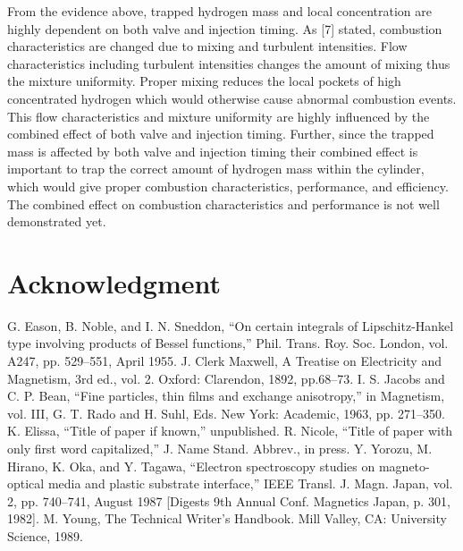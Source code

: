\documentclass[conference]{IEEEtran}
\begin{document}
From the evidence above, trapped hydrogen mass and local concentration are highly dependent on both valve and injection timing.  
As [7] stated, combustion characteristics are changed due to mixing and turbulent intensities.
Flow characteristics including turbulent intensities changes the amount of mixing thus the mixture uniformity. Proper mixing reduces the local pockets of high concentrated hydrogen which would otherwise cause abnormal combustion events.
This flow characteristics and mixture uniformity are highly influenced by the combined effect of both valve and injection timing.
Further, since the trapped mass is affected by both valve and injection timing their combined effect is important to trap the correct amount of hydrogen mass within the cylinder, which would give proper combustion characteristics, performance, and efficiency.
The combined effect on combustion characteristics and performance is not well demonstrated yet.


\section*{Acknowledgment}



\begin{thebibliography}{00}
 G. Eason, B. Noble, and I. N. Sneddon, ``On certain integrals of Lipschitz-Hankel type involving products of Bessel functions,'' Phil. Trans. Roy. Soc. London, vol. A247, pp. 529--551, April 1955.
 J. Clerk Maxwell, A Treatise on Electricity and Magnetism, 3rd ed., vol. 2. Oxford: Clarendon, 1892, pp.68--73.
 I. S. Jacobs and C. P. Bean, ``Fine particles, thin films and exchange anisotropy,'' in Magnetism, vol. III, G. T. Rado and H. Suhl, Eds. New York: Academic, 1963, pp. 271--350.
 K. Elissa, ``Title of paper if known,'' unpublished.
 R. Nicole, ``Title of paper with only first word capitalized,'' J. Name Stand. Abbrev., in press.
 Y. Yorozu, M. Hirano, K. Oka, and Y. Tagawa, ``Electron spectroscopy studies on magneto-optical media and plastic substrate interface,'' IEEE Transl. J. Magn. Japan, vol. 2, pp. 740--741, August 1987 [Digests 9th Annual Conf. Magnetics Japan, p. 301, 1982].
 M. Young, The Technical Writer's Handbook. Mill Valley, CA: University Science, 1989.
\end{thebibliography}
\end{document}
